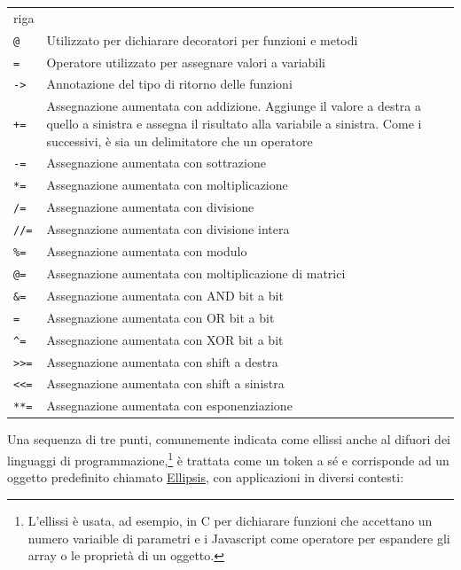 \documentclass[
  letterpaper,
]{scrbook}
\begin{document}
\begin{longtable}[]{@{}
  >{\raggedright\arraybackslash}p{}
  >{\raggedright\arraybackslash}p{}@{}}
riga \\
\texttt{@} & Utilizzato per dichiarare decoratori per funzioni e
metodi \\
\texttt{=} & Operatore utilizzato per assegnare valori a variabili \\
\texttt{-\textgreater{}} & Annotazione del tipo di ritorno delle
funzioni \\
\texttt{+=} & Assegnazione aumentata con addizione. Aggiunge il valore a
destra a quello a sinistra e assegna il risultato alla variabile a
sinistra. Come i successivi, è sia un delimitatore che un operatore \\
\texttt{-=} & Assegnazione aumentata con sottrazione \\
\texttt{*=} & Assegnazione aumentata con moltiplicazione \\
\texttt{/=} & Assegnazione aumentata con divisione \\
\texttt{//=} & Assegnazione aumentata con divisione intera \\
\texttt{\%=} & Assegnazione aumentata con modulo \\
\texttt{@=} & Assegnazione aumentata con moltiplicazione di matrici \\
\texttt{\&=} & Assegnazione aumentata con AND bit a bit \\
\texttt{\textbar{}=} & Assegnazione aumentata con OR bit a bit \\
\texttt{\^{}=} & Assegnazione aumentata con XOR bit a bit \\
\texttt{\textgreater{}\textgreater{}=} & Assegnazione aumentata con
shift a destra \\
\texttt{\textless{}\textless{}=} & Assegnazione aumentata con shift a
sinistra \\
\texttt{**=} & Assegnazione aumentata con esponenziazione \\
\end{longtable}

Una sequenza di tre punti, comunemente indicata come ellissi anche al
difuori dei linguaggi di programmazione,\footnote{L'ellissi è usata, ad
  esempio, in C per dichiarare funzioni che accettano un numero
  variaible di parametri e i Javascript come operatore per espandere gli
  array o le proprietà di un oggetto.} è trattata come un token a sé e
corrisponde ad un oggetto predefinito chiamato
\href{https://docs.python.org/3/reference/datamodel.html\#ellipsis}{Ellipsis},
con applicazioni in diversi contesti:
\end{document}
